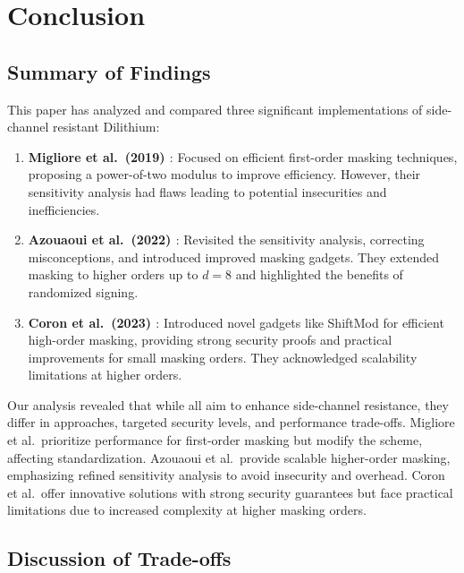 
\chapter{Conclusion}
\thispagestyle{chapterstart}

\section{Summary of Findings}

This paper has analyzed and compared three significant implementations of side-channel resistant Dilithium:

\begin{enumerate}
    \item \textbf{Migliore et al.\ (2019) \cite{Migliore19}}: Focused on efficient first-order masking techniques, proposing a power-of-two modulus to improve efficiency. However, their sensitivity analysis had flaws leading to potential insecurities and inefficiencies.
    \item \textbf{Azouaoui et al.\ (2022) \cite{Azouaoui22}}: Revisited the sensitivity analysis, correcting misconceptions, and introduced improved masking gadgets. They extended masking to higher orders up to \( d = 8 \) and highlighted the benefits of randomized signing.
    \item \textbf{Coron et al.\ (2023) \cite{Coron23}}: Introduced novel gadgets like ShiftMod for efficient high-order masking, providing strong security proofs and practical improvements for small masking orders. They acknowledged scalability limitations at higher orders.
\end{enumerate}

Our analysis revealed that while all aim to enhance side-channel resistance, they differ in approaches, targeted security levels, and performance trade-offs. Migliore et al.\ prioritize performance for first-order masking but modify the scheme, affecting standardization. Azouaoui et al.\ provide scalable higher-order masking, emphasizing refined sensitivity analysis to avoid insecurity and overhead. Coron et al.\ offer innovative solutions with strong security guarantees but face practical limitations due to increased complexity at higher masking orders.

\section{Discussion of Trade-offs}

